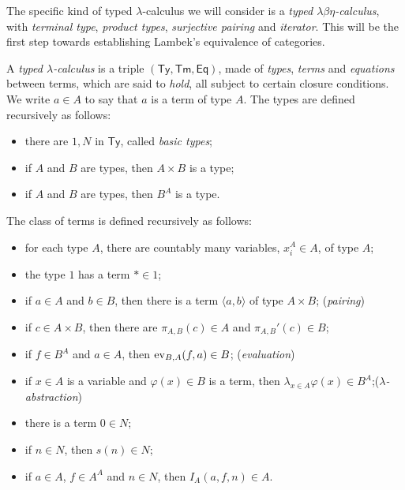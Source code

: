 The specific kind of typed $\lambda$-calculus we will consider is a \emph{typed $\lambda\beta\eta$-calculus}, with \emph{terminal type}, \emph{product types}, \emph{surjective pairing} and \emph{iterator}.
This will be the first step towards establishing Lambek's equivalence of categories.

\begin{definition}
    A \emph{typed $\lambda$-calculus} is a triple $(\textsf{Ty},\textsf{Tm},\textsf{Eq})$, made of \emph{types}, \emph{terms} and \emph{equations} between terms,\label{idx:typed-calculus}
    which are said to \emph{hold}, all subject to certain closure conditions. We write $a \in A$ to say that $a$ is a term of type $A$.
    The types are defined recursively as follows:
    \begin{itemize}
        \item[(Ty1)] there are $1,N$ in $\textsf{Ty}$, called \emph{basic types};
        \item[(Ty2)] if $A$ and $B$ are types, then $A \times B$ is a type;
        \item[(Ty3)] if $A$ and $B$ are types, then $B^A$ is a type.
    \end{itemize}
    The class of terms is defined recursively as follows:
    \begin{itemize}
        \item[(Tm1)] for each type $A$, there are countably many variables, $x_i^A \in A$, of type $A$;
        \item[(Tm2)] the type $1$ has a term $* \in 1$;
        \item[(Tm3a)] if $a \in A$ and $b \in B$, then there is a term $\langle a,b\rangle$ of type $A \times B$; (\emph{pairing})
        \item[(Tm3b)] if $c \in A \times B$, then there are $\pi_{A,B}(c) \in A$ and $\pi_{A,B}'(c) \in B$;
        \item[(Tm4)] if $f \in B^A$ and $a \in A$, then $\operatorname{ev}_{B,A}(f,a) \in B$; (\emph{evaluation})
        \item[(Tm5)] if $x \in A$ is a variable and $\varphi(x) \in B$ is a term, then $\lambda_{x \in A} \varphi(x) \in B^A$;\newline (\emph{$\lambda$-abstraction})\label{idx:abstraction}
        \item[(Tm6a)] there is a term $0 \in N$;
        \item[(Tm6b)] if $n \in N$, then $s(n) \in N$;
        \item[(Tm7)] if $a \in A$, $f \in A^A$ and $n \in N$, then $I_A(a,f,n) \in A$.\label{idx:iterator-term}

\end{itemize}
\end{definition}
